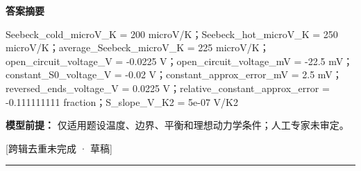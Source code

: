 \documentclass[UTF8,11pt,a4paper]{ctexart}
\begin{document}
\noindent\textbf{答案摘要}\par
Seebeck\_cold\_microV\_K = 200 microV/K；Seebeck\_hot\_microV\_K = 250 microV/K；average\_Seebeck\_microV\_K = 225 microV/K；open\_circuit\_voltage\_V = -0.0225 V；open\_circuit\_voltage\_mV = -22.5 mV；constant\_S0\_voltage\_V = -0.02 V；constant\_approx\_error\_mV = 2.5 mV；reversed\_ends\_voltage\_V = 0.0225 V；relative\_constant\_approx\_error = -0.111111111 fraction；S\_slope\_V\_K2 = 5e-07 V/K2\par
\noindent\textbf{模型前提：}
仅适用题设温度、边界、平衡和理想动力学条件；人工专家未审定。\par
\noindent\textcolor{red!65!black}{[跨辑去重未完成 · 草稿]} \par
\medskip\hrule\medskip
\end{document}
